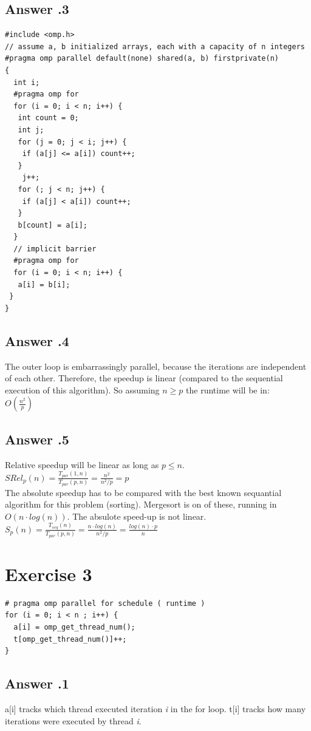 \documentclass[a4paper,%
11pt,%
DIV=12,
headsepline,%
headings=normal,
]{scrartcl}
\newcounter{curex}
\newcommand{\exercise}[1]{\section*{Exercise #1}\setcounter{curex}{#1}}
\newcommand{\answer}[1]{\subsection*{Answer \arabic{curex}.#1}}
\begin{document}
\answer{3}
\begin{lstlisting}
#include <omp.h>
// assume a, b initialized arrays, each with a capacity of n integers
#pragma omp parallel default(none) shared(a, b) firstprivate(n)
{
  int i;
  #pragma omp for
  for (i = 0; i < n; i++) {
   int count = 0;
   int j;
   for (j = 0; j < i; j++) {
    if (a[j] <= a[i]) count++;
   }
    j++;
   for (; j < n; j++) {
    if (a[j] < a[i]) count++;
   }
   b[count] = a[i];
  }
  // implicit barrier
  #pragma omp for
  for (i = 0; i < n; i++) {
   a[i] = b[i];
 }
}
\end{lstlisting}

\answer{4}
The outer loop is embarrassingly parallel, because the iterations are independent of each other. Therefore, the speedup is linear (compared to the sequential execution of this algorithm). So assuming $n \geq p$ the runtime will be in:\\
\begin{math}O(\frac{n^2}{p})\end{math}\\

\answer{5}
Relative speedup will be linear as long as $p \leq n$.\\

\begin{math}SRel_{p}(n)=\frac{T_{par}(1,n)}{T_{par}(p,n)} = \frac{n^2}{n^2/p} = p \end{math}\\
The absolute speedup has to be compared with the best known sequantial algorithm for this problem (sorting). Mergesort is on of these, running in \begin{math}O(n \cdot log(n))\end{math}. The absulote speed-up is not linear.\\

\begin{math}S_{p}(n)=\frac{T_{seq}(n)}{T_{par}(p,n)} = \frac{n \cdot log(n)}{n^2/p} = \frac{log(n) \cdot p}{n} \end{math}\\



\exercise{3}
\begin{lstlisting}
# pragma omp parallel for schedule ( runtime )
for (i = 0; i < n ; i++) {
  a[i] = omp_get_thread_num();
  t[omp_get_thread_num()]++;
}
\end{lstlisting}
\answer{1}
a[i] tracks which thread executed iteration \emph{i} in the for loop.
t[i] tracks how many iterations were executed by thread \emph{i}.
\end{document}
